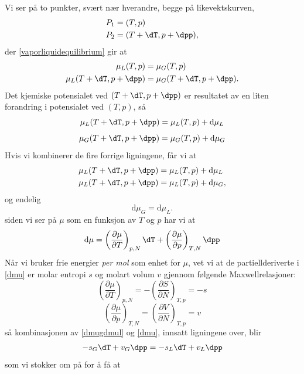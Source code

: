 Vi ser på to punkter, svært nær hverandre, begge på likevektskurven,
\begin{align}
    P_1 &= (T,p) \\ P_2 &= (T+\dT,p+\dpp),
\end{align}
der \eqref{vaporliquidequilibrium} gir at 
\begin{align}
	\mu_L(T,p)&=\mu_G(T,p) \\ \mu_L(T+\dT,p+\dpp)&=\mu_G(T+\dT,p+\dpp).    
\end{align}
Det kjemiske potensialet ved $(T+\dT,p+\dpp)$ er resultatet av en liten forandring i potensialet ved $(T,p)$, så
\begin{equation}
	\mu_L(T+\dT,p+\dpp) = \mu_L(T,p) + \text{d}\mu_L
\end{equation}
\begin{equation}
	\mu_G(T+\dT,p+\dpp) = \mu_G(T,p) + \text{d}\mu_G
\end{equation}
Hvis vi kombinerer de fire forrige ligningene, får vi at
\begin{align}
    \mu_L(T+\dT,p+\dpp)&=\mu_L(T,p)+\text{d}\mu_L \\
    \mu_L(T+\dT,p+\dpp)&=\mu_L(T,p)+\text{d}\mu_G,
\end{align}
og endelig
\begin{equation}
	\label{dmugdmul}
	\text{d}\mu_G=\text{d}\mu_L.
\end{equation}
siden vi ser på $\mu$ som en funksjon av $T$ og $p$ har vi at
\begin{equation}
	\label{dmu}
	\text{d}\mu=\left(\frac{\partial \mu}{\partial T}\right)_{p,N}\dT+\left(\frac{\partial \mu}{\partial p}\right)_{T,N}\dpp
\end{equation}
Når vi bruker frie energier \emph{per mol} som enhet for $\mu$, vet vi at de partiellderiverte i \eqref{dmu} er molar entropi $s$ og molart volum $v$ gjennom følgende Maxwellrelasjoner:
\begin{equation}
	\left(\frac{\partial \mu}{\partial T}\right)_{p,N}=-\left(\frac{\partial S}{\partial N}\right)_{T,p} = -s
\end{equation}
\begin{equation}
	\left(\frac{\partial \mu}{\partial p}\right)_{T,N}=\left(\frac{\partial V}{\partial N}\right)_{T,p} = v
\end{equation}
så kombinasjonen av \eqref{dmugdmul} og \eqref{dmu}, innsatt ligningene over, blir
\begin{equation}
	-s_G\dT+v_G\dpp=-s_L\dT+v_L\dpp
\end{equation}
som vi stokker om på for å få at
